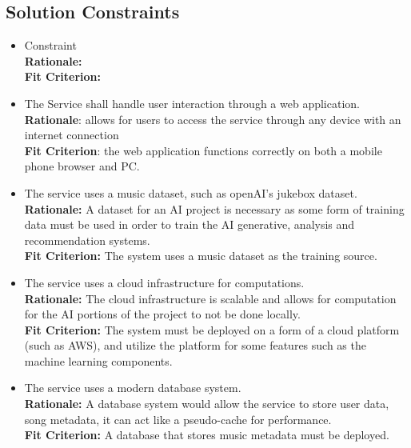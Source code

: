 \documentclass[12pt]{article}
\begin{document}
\subsection{Solution Constraints}
\begin{itemize}
  \item Constraint
  \\ \textbf{Rationale:} 
  \\ \textbf{Fit Criterion:} 

  \item The Service shall handle user interaction through a web application.
  \\\textbf{Rationale}: allows for users to access the service through any device with an internet connection
  \\\textbf{Fit Criterion}: the web application functions correctly on both a mobile phone browser and PC. 

  \item The service uses a music dataset, such as openAI's jukebox dataset. 
  \\ \textbf{Rationale:} A dataset for an AI project is necessary as some form of training data must be used 
  in order to train the AI generative, analysis and recommendation systems. 
  \\ \textbf{Fit Criterion:} The system uses a music dataset as the training source. 

  \item The service uses a cloud infrastructure for computations.
  \\ \textbf{Rationale:} The cloud infrastructure is scalable and allows for computation for the AI portions
  of the project to not be done locally. 
  \\ \textbf{Fit Criterion:} The system must be deployed on a form of a cloud platform (such as AWS), and utilize the platform for some features
  such as the machine learning components. 

  \item The service uses a modern database system. 
  \\ \textbf{Rationale:} A database system would allow the service to store user data, song metadata, it can act like a pseudo-cache for performance. 
  \\ \textbf{Fit Criterion:} A database that stores music metadata must be deployed. 
  

\end{itemize}
\end{document}
